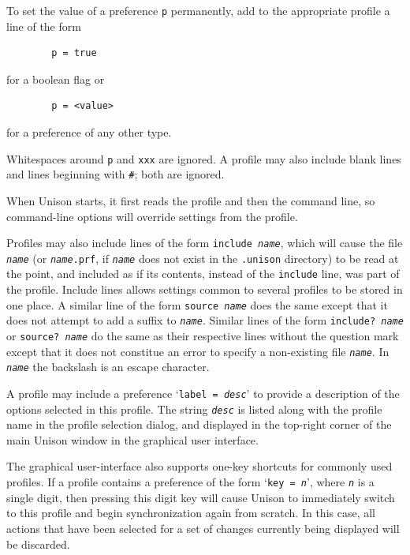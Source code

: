 \documentclass{article}
\newcommand{\ARG}[1]{\texttt{\textit{#1}}}
\begin{document}
To set the value of a preference {\tt p} permanently, add to the
appropriate profile a line of the form
\begin{verbatim}
        p = true
\end{verbatim}
for a boolean flag or
\begin{verbatim}
        p = <value>
\end{verbatim}
for a preference of any other type.

Whitespaces around {\tt p} and {\tt xxx} are ignored.
A profile may also include blank lines and lines beginning
with {\tt \#}; both are ignored.

When Unison starts, it first reads the profile and then the command
line, so command-line options will override settings from the
profile.

Profiles may also include lines of the form \texttt{include \ARG{name}},
which will cause the file \ARG{name} (or \texttt{\ARG{name}.prf}, if
\ARG{name} does not exist in the \verb+.unison+ directory) to be read at
the point, and included as if its contents, instead of the \texttt{include}
line, was part of the profile.  Include lines allows settings common to
several profiles to be stored in one place.
A similar line of the form \texttt{source \ARG{name}} does the same except
that it does not attempt to add a suffix to \ARG{name}.
Similar lines of the form \texttt{include\mbox{?} \ARG{name}} or
\texttt{source\mbox{?} \ARG{name}} do the same as their respective lines
without the question mark except that it does not constitue an error to
specify a non-existing file \ARG{name}.
In \ARG{name} the backslash is an escape character.

A profile may include a preference `\texttt{label = \ARG{desc}}' to
provide a description of the options selected in this profile.  The
string \ARG{desc} is listed along with the profile name in the profile
selection dialog, and displayed in the top-right corner of the main
Unison window in the graphical user interface.

The graphical user-interface also supports one-key shortcuts for commonly
used profiles.  If a profile contains a preference of the form
%
`\texttt{key = \ARG{n}}', where \ARG{n} is a single digit, then
pressing this digit key will cause Unison to immediately switch to
this profile and begin synchronization again from scratch.  In this
case, all actions that have been selected for a set of changes
currently being displayed will be discarded.


\end{document}

